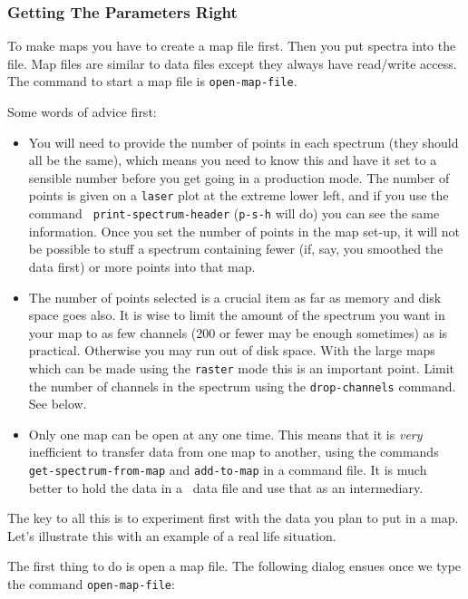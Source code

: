 \subsubsection{Getting The Parameters Right}
\label{sec:specx_13.1}
To make maps you have to create a map file first.  Then you put
spectra into the file.  Map files are similar to data files except
they always have read/write access.  The command to start a map file
is {\tt open-map-file}.

Some words of advice first:
\begin{itemize}
\item
You will need to provide the number of points in each spectrum (they
should all be the same), which means you need to know this and have it
set to a sensible number before you get going in a production
mode. The number of points is given on a {\tt laser} plot at the
extreme lower left, and if you use the command {\tt
print-spectrum-header} ({\tt{p-s-h}} will do) you can see the same
information. Once you set the number of points in the map set-up, it
will not be possible to stuff a spectrum containing fewer (if, say,
you smoothed the data first) or more points into that map.
\item
The number of points selected is a crucial item as far as memory and
disk space goes also. It is wise to limit the amount of the spectrum
you want in your map to as few channels (200 or fewer may be enough
sometimes) as is practical. Otherwise you may run out of disk
space. With the large maps which can be made using the {\tt raster}
mode this is an important point. Limit the number of channels in the
spectrum using the {\tt drop-channels} command. See below.
\item
Only one map can be open at any one time. This means that it is {\it
very} inefficient to transfer data from one map to another, using the
commands
\verb|get-spectrum-from-map| and {\tt add-to-map} in a command file. It is
much better to hold the data in a \SPECX\ data file and use that as an
intermediary. 
\end{itemize}

The key to all this is to experiment first with the data you plan to
put in a map. Let's illustrate this with an example of a real life
situation.

The first thing to do is open a map file. The following dialog ensues once we 
type the command {\tt open-map-file}: 

